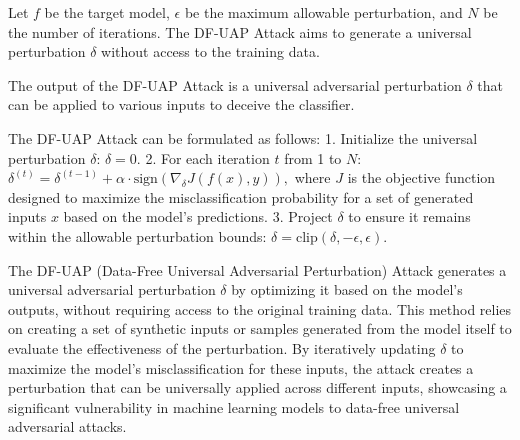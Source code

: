 Let \( f \) be the target model, \( \epsilon \) be the maximum allowable perturbation, and \( N \) be the number of iterations. The DF-UAP Attack aims to generate a universal perturbation \( \delta \) without access to the training data.

The output of the DF-UAP Attack is a universal adversarial perturbation \( \delta \) that can be applied to various inputs to deceive the classifier.

The DF-UAP Attack can be formulated as follows:
1. Initialize the universal perturbation \( \delta \):
   $
   \delta = 0.
   $
2. For each iteration \( t \) from 1 to \( N \):
   $
   \delta^{(t)} = \delta^{(t-1)} + \alpha \cdot \text{sign} \left( \nabla_{\delta} J(f(x), y) \right),
   $
   where \( J \) is the objective function designed to maximize the misclassification probability for a set of generated inputs \( x \) based on the model's predictions.
3. Project \( \delta \) to ensure it remains within the allowable perturbation bounds:
   $
   \delta = \text{clip}(\delta, -\epsilon, \epsilon).
   $

The DF-UAP (Data-Free Universal Adversarial Perturbation) Attack generates a universal adversarial perturbation \( \delta \) by optimizing it based on the model's outputs, without requiring access to the original training data. This method relies on creating a set of synthetic inputs or samples generated from the model itself to evaluate the effectiveness of the perturbation. By iteratively updating \( \delta \) to maximize the model's misclassification for these inputs, the attack creates a perturbation that can be universally applied across different inputs, showcasing a significant vulnerability in machine learning models to data-free universal adversarial attacks.
